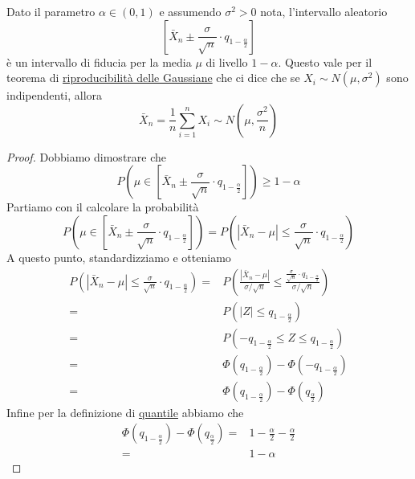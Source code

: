 \begin{proposition}
	Dato il parametro $\alpha \in (0,1)$ e assumendo $\sigma^2 > 0$ nota, l'intervallo aleatorio
	\[
		\left[ \bar{X}_n \pm \frac{\sigma}{\sqrt{n}} \cdot q_{1 - \frac{\alpha}{2}} \right]
	\]
	è un intervallo di fiducia per la media $\mu$ di livello $1 - \alpha$. Questo vale per il
	teorema di \hyperref[prop: riprod_gauss]{riproducibilità delle Gaussiane} che ci dice che se
	$X_i \sim N(\mu, \sigma^2)$ sono indipendenti, allora
	\[
		\bar{X}_n = \frac{1}{n} \sum_{i=1}^n X_i \sim
		N \left( \mu, \frac{\sigma^2}{n} \right)
	\]
	\begin{proof}
		Dobbiamo dimostrare che
		\[
			P \left( \mu \in \left[ \bar{X}_n \pm \frac{\sigma}{\sqrt{n}}
				\cdot q_{1-\frac{\alpha}{2}} \right] \right) \geq 1 - \alpha
		\]
		Partiamo con il calcolare la probabilità
		\[
			P \left( \mu \in \left[ \bar{X}_n \pm
				\frac{\sigma}{\sqrt{n}} \cdot q_{1-\frac{\alpha}{2}} \right] \right) =
			P \left( \left| \bar{X}_n - \mu \right| \leq
			\frac{\sigma}{\sqrt{n}} \cdot q_{1 - \frac{\alpha}{2}} \right)
		\]
		A questo punto, standardizziamo e otteniamo
		\begin{align*}
			P \left( |\bar{X}_n - \mu| \leq
			\frac{\sigma}{\sqrt{n}} \cdot q_{1 - \frac{\alpha}{2}} \right) = &
			P \left( \frac{|\bar{X}_n - \mu|}{\sigma / \sqrt{n}} \leq
			\frac{\frac{\sigma}{\sqrt{n}} \cdot q_{1-\frac{\alpha}{2}}}{\sigma/\sqrt{n}} \right) \\
			=                                                                &
			P \left( |Z| \leq q_{1 - \frac{\alpha}{2}} \right)                                   \\
			=                                                                &
			P \left( -q_{1 - \frac{\alpha}{2}} \leq Z \leq q_{1-\frac{\alpha}{2}} \right)        \\
			=                                                                &
			\Phi \left( q_{1-\frac{\alpha}{2}} \right) -
			\Phi \left(-q_{1-\frac{\alpha}{2}} \right)                                           \\
			=                                                                &
			\Phi \left( q_{1-\frac{\alpha}{2}} \right) -
			\Phi \left(q_{\frac{\alpha}{2}} \right)
		\end{align*}
		Infine per la definizione di \hyperref[def: quantile]{quantile} abbiamo che
		\begin{align*}
			\Phi \left( q_{1-\frac{\alpha}{2}} \right) -
			\Phi \left(q_{\frac{\alpha}{2}} \right) = & 1 - \frac{\alpha}{2} -
			\frac{\alpha}{2}                                                   \\
			=                                         & 1 - \alpha
		\end{align*}
	\end{proof}
\end{proposition}

